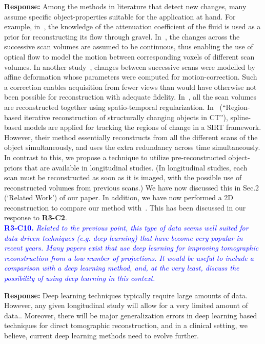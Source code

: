 \documentclass{article}
\begin{document}
\textbf{Response:} Among the methods in literature that detect new changes, many assume specific object-properties suitable for the application at hand.  For example, in~\cite{Van2015}, the knowledge of the attenuation coefficient of the fluid is used as a prior for reconstructing its flow through gravel. In~\cite{koen2020}, the changes across the successive scan volumes are assumed to be continuous, thus enabling the use of optical flow to model the motion between corresponding voxels of different scan volumes. In another study~\cite{vincent2017}, changes between successive scans were modelled by affine deformation whose parameters were computed for motion-correction. Such a correction enables acquisition from fewer views than would have otherwise not been possible for reconstruction with adequate fidelity. In~\cite{daniil2015}, all the scan volumes are reconstructed together using spatio-temporal regularization. 
In~\cite{Van2014} (``Region-based iterative reconstruction of structurally changing objects in CT''), spline-based models are applied for tracking the regions of change in a SIRT framework. However, their method essentially reconstructs from all the different scans of the object simultaneously, and uses the extra redundancy across time simultaneously. In contrast to this, we propose a technique to utilize pre-reconstructed object-priors that are available in longitudinal studies. (In longitudinal studies, each scan must be reconstructed as soon as it is imaged, with the possible use of reconstructed volumes from previous scans.) 
We have now discussed this in Sec.2 (`Related Work') of our paper.
In addition, we have now performed a 2D reconstruction to compare our method with~\cite{Lee2012}. This has been discussed in our response to \textbf{R3-C2}.\\

\textcolor{blue}{\textbf{R3-C10.}\textit{ Related to the previous point, this type of data seems well suited for data-driven techniques (e.g. deep learning) that have become very popular in recent years. Many papers exist that use deep learning for improving tomographic reconstruction from a low number of projections. It would be useful to include a comparison with a deep learning method, and, at the very least, discuss the possibility of using deep learning in this context.}}
    
\textbf{Response:} Deep learning techniques typically require large amounts of data. However, any given longitudinal study will allow for a very limited amount of data.. Moreover, there will be major generalization errors in deep learning based techniques for direct tomographic reconstruction, and in a clinical setting, we believe, current deep learning methods need to evolve further.\\
\end{document}
